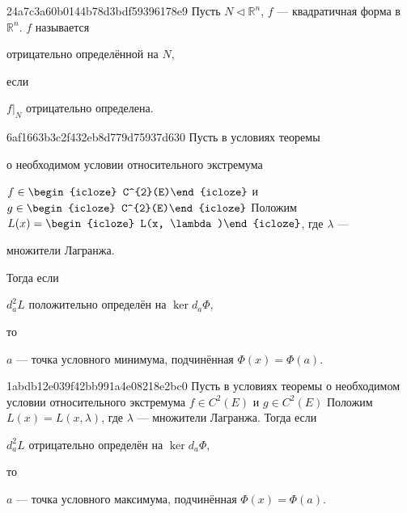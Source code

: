 \begin{note}{24a7c3a60b0144b78d3bdf59396178e9}
    Пусть \({ N \triangleleft \mathbb R^{n} }\), \({ f }\) --- квадратичная форма в \({ \mathbb R^{n} }\).
    \({ f }\) называется \begin{icloze}{2}отрицательно определённой на \({ N }\),\end{icloze} если \begin{icloze}{1}\({ f|_{N} }\) отрицательно определена.\end{icloze}
\end{note}

\begin{note}{6af1663b3c2f432eb8d779d75937d630}
    Пусть в условиях теоремы \begin{icloze}{6}о необходимом условии относительного экстремума\end{icloze} \({ f \in \begin{icloze}{5}C^{2}(E)\end{icloze} }\) и \({ g \in \begin{icloze}{5}C^{2}(E)\end{icloze} }\)
    Положим \({ L(x) = \begin{icloze}{4}L(x, \lambda)\end{icloze} }\), где \({ \lambda }\) --- \begin{icloze}{3}множители Лагранжа.\end{icloze}
    Тогда если \begin{icloze}{1}\({ d_{a}^2L }\) положительно определён на \({ \ker d_{a}\Phi }\),\end{icloze} то \begin{icloze}{2}\({ a }\) --- точка условного минимума, подчинённая \({ \Phi(x) = \Phi(a) }\).\end{icloze}
\end{note}

\begin{note}{1abdb12e039f42bb991a4e08218e2bc0}
    Пусть в условиях теоремы о необходимом условии относительного экстремума \({ f \in C^{2}(E) }\) и \({ g \in C^{2}(E) }\)
    Положим \({ L(x) = L(x, \lambda) }\), где \({ \lambda }\) --- множители Лагранжа.
    Тогда если \begin{icloze}{1}\({ d_{a}^2L }\) отрицательно определён на \({ \ker d_{a}\Phi }\),\end{icloze} то \begin{icloze}{2}\({ a }\) --- точка условного максимума, подчинённая \({ \Phi(x) = \Phi(a) }\).\end{icloze}
\end{note}

